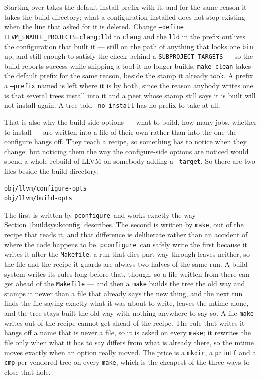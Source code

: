 \documentclass{article}
\newcommand{\pconfigure}{\texttt{pconfigure}}
\begin{document}
Starting over takes the default install prefix with it, and for the
same reason it takes the build directory: what a configuration
installed does not stop existing when the line that asked for it is
deleted.  Change \texttt{--define LLVM\_ENABLE\_PROJECTS=clang;lld} to
\texttt{clang} and the \texttt{lld} in the prefix outlives the
configuration that built it --- still on the path of anything that
looks one \texttt{bin} up, and still enough to satisfy the check
behind a \texttt{SUBPROJECT\_TARGETS} --- so the build reports success
while shipping a tool it no longer builds.  \texttt{make clean} takes
the default prefix for the same reason, beside the stamp it already
took.  A prefix a \texttt{--prefix} named is left where it is by both,
since the reason anybody writes one is that several trees install into
it and a peer whose stamp still says it is built will not install
again.  A tree told \texttt{--no-install} has no prefix to take at
all.

That is also why the build-side options --- what to build, how many
jobs, whether to install --- are written into a file of their own
rather than into the one the configure hangs off.  They reach a
recipe, so something has to notice when they change; but noticing them
the way the configure-side options are noticed would spend a whole
rebuild of LLVM on somebody adding a \texttt{--target}.  So there are
two files beside the build directory:

\begin{verbatim}
obj/llvm/configure-opts
obj/llvm/build-opts
\end{verbatim}

The first is written by \pconfigure\ and works exactly the way
Section~\ref{buildsys:kconfig} describes.  The second is written by
\texttt{make}, out of the recipe that reads it, and that difference is
deliberate rather than an accident of where the code happens to be.
\pconfigure\ can safely write the first because it writes it after the
\texttt{Makefile}: a run that dies part way through leaves neither, so
the file and the recipe it guards are always two halves of the same
run.  A build system writes its rules long before that, though, so a
file written from there can get ahead of the \texttt{Makefile} --- and
then a \texttt{make} builds the tree the old way and stamps it newer
than a file that already says the new thing, and the next run finds
the file saying exactly what it was about to write, leaves the mtime
alone, and the tree stays built the old way with nothing anywhere to
say so.  A file \texttt{make} writes out of the recipe cannot get
ahead of the recipe.  The rule that writes it hangs off a name that is
never a file, so it is asked on every \texttt{make}; it rewrites the
file only when what it has to say differs from what is already there,
so the mtime moves exactly when an option really moved.  The price is
a \texttt{mkdir}, a \texttt{printf} and a \texttt{cmp} per vendored
tree on every \texttt{make}, which is the cheapest of the three ways
to close that hole.
\end{document}
